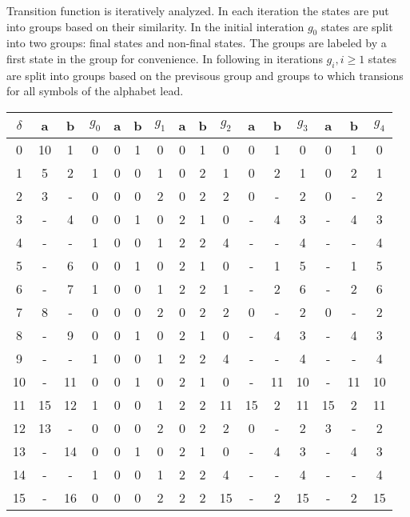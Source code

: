 Transition function is iteratively analyzed. In each iteration the states are put into groups based on their similarity. In the initial interation $g_0$ states are split into two groups: final states and non-final states. The groups are labeled by a first state in the group for convenience. In following in iterations $g_i, i \geq 1$ states are split into groups based on the previsous group and groups to which transions for all symbols of the alphabet lead.

\begin{table}[h]
  \footnotesize
	\begin{tabular}{|c||c|c||c||c|c||c||c|c||c||c|c||c||c|c||c||}
		\hline
		$\delta$ & a & b & $g_0$ & a & b & $g_1$ & a & b & $g_2$ & a & b & $g_3$ & a & b & $g_4$\\ \hline
		0  & 10 & 1  & 0 & 0 & 1 & 0 & 0 & 1 & 0  & 0  & 1  & 0 & 0  & 1  & 0 \\ 
		1  & 5  & 2  & 1 & 0 & 0 & 1 & 0 & 2 & 1  & 0  & 2  & 1 & 0  & 2  & 1 \\
		2  & 3  & -  & 0 & 0 & 0 & 2 & 0 & 2 & 2  & 0  & -  & 2 & 0  & -  & 2 \\
		3  & -  & 4  & 0 & 0 & 1 & 0 & 2 & 1 & 0  & -  & 4  & 3 & -  & 4  & 3 \\
		4  & -  & -  & 1 & 0 & 0 & 1 & 2 & 2 & 4  & -  & -  & 4 & -  & -  & 4 \\
		5  & -  & 6  & 0 & 0 & 1 & 0 & 2 & 1 & 0  & -  & 1  & 5 & -  & 1  & 5 \\
		6  & -  & 7  & 1 & 0 & 0 & 1 & 2 & 2 & 1  & -  & 2  & 6 & -  & 2  & 6 \\
		7  & 8  & -  & 0 & 0 & 0 & 2 & 0 & 2 & 2  & 0  & -  & 2 & 0  & -  & 2 \\
		8  & -  & 9  & 0 & 0 & 1 & 0 & 2 & 1 & 0  & -  & 4  & 3 & -  & 4  & 3 \\
		9  & -  & -  & 1 & 0 & 0 & 1 & 2 & 2 & 4  & -  & -  & 4 & -  & -  & 4 \\
		10 & -  & 11 & 0 & 0 & 1 & 0 & 2 & 1 & 0  & -  & 11 & 10& -  & 11 & 10 \\
		11 & 15 & 12 & 1 & 0 & 0 & 1 & 2 & 2 & 11 & 15 & 2  & 11& 15 & 2  & 11\\
		12 & 13 & -  & 0 & 0 & 0 & 2 & 0 & 2 & 2  & 0  & -  & 2 & 3  & -  & 2 \\
		13 & -  & 14 & 0 & 0 & 1 & 0 & 2 & 1 & 0  & -  & 4  & 3 & -  & 4  & 3 \\
		14 & -  & -  & 1 & 0 & 0 & 1 & 2 & 2 & 4  & -  & -  & 4 & -  & -  & 4 \\
		15 & -  & 16 & 0 & 0 & 0 & 2 & 2 & 2 & 15 & -  & 2  & 15& -  & 2  & 15\\

\end{tabular}
\end{table}
